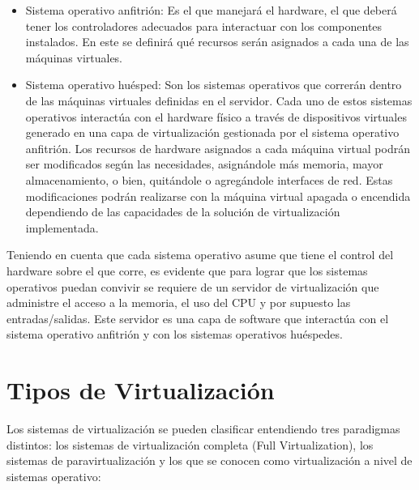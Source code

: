 	\begin{itemize}
		\item {Sistema operativo anfitrión: Es el que manejará el hardware, el que deberá tener los controladores adecuados para interactuar con los componentes instalados. En este se definirá qué recursos serán asignados a cada una de las máquinas virtuales.}
		
		\item {Sistema operativo huésped: Son los sistemas operativos que correrán dentro de las máquinas virtuales definidas en el servidor. Cada uno de estos sistemas operativos interactúa con el hardware físico a través de dispositivos virtuales generado en una capa de virtualización gestionada por el sistema operativo anfitrión. Los recursos de hardware asignados a cada máquina virtual podrán ser modificados según las necesidades, asignándole más memoria, mayor almacenamiento, o bien, quitándole o agregándole interfaces de red. Estas modificaciones podrán realizarse con la máquina virtual apagada o encendida dependiendo de las capacidades de la solución de virtualización implementada.} \newline
		
	\end{itemize}
	
	Teniendo en cuenta que cada sistema operativo asume que tiene el control del hardware sobre el que corre, es evidente que para lograr que los sistemas operativos puedan convivir se requiere de un servidor de virtualización que administre el acceso a la memoria, el uso del CPU y por supuesto las entradas/salidas. Este servidor es una capa de software que interactúa con el sistema operativo anfitrión y con los sistemas operativos huéspedes.

	
	\section{Tipos de Virtualización}\nopagebreak[0]
	
	Los sistemas de virtualización se pueden clasificar entendiendo tres paradigmas distintos: los sistemas de virtualización completa (Full Virtualization), los sistemas de paravirtualización y los que se conocen como virtualización a nivel de sistemas operativo:
	

